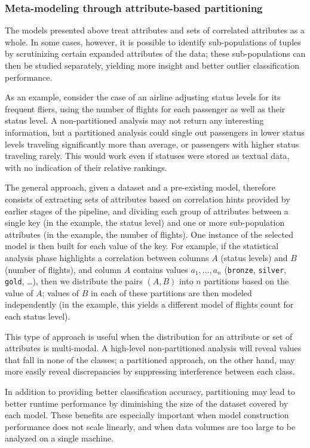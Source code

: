\subsubsection{Meta-modeling through attribute-based partitioning}
\label{sec:partitioning}

The models presented above treat attributes and sets of correlated attributes as a whole. In some cases, however, it is possible to identify sub-populations of tuples by scrutinizing certain expanded attributes of the data; these sub-populations can then be studied separately, yielding more insight and better outlier classification performance.

As an example, consider the case of an airline adjusting status levels for its frequent fliers, using the number of flights for each passenger as well as their status level. A non-partitioned analysis may not return any interesting information, but a partitioned analysis could single out passengers in lower status levels traveling significantly more than average, or passengers with higher status traveling rarely. This would work even if statuses were stored as textual data, with no indication of their relative rankings.

The general approach, given a dataset and a pre-existing model, therefore consists of extracting sets of attributes based on correlation hints provided by earlier stages of the pipeline, and dividing each group of attributes between a single key (in the example, the status level) and one or more sub-population attributes (in the example, the number of flights). One instance of the selected model is then built for each value of the key. For example, if the statistical analysis phase highlights a correlation between columns $A$ (status levels) and $B$ (number of flights), and column $A$ contains values $a_1, \dots, a_n$ (\texttt{bronze}, \texttt{silver}, \texttt{gold}, \dots), then we distribute the pairs $(A, B)$ into $n$ partitions based on the value of $A$; values of $B$ in each of these partitions are then modeled independently (in the example, this yields a different model of flights count for each status level).

This type of approach is useful when the distribution for an attribute or set of attributes is multi-modal. A high-level non-partitioned analysis will reveal values that fall in none of the classes; a partitioned approach, on the other hand, may more easily reveal discrepancies by suppressing interference between each class.

In addition to providing better classification accuracy, partitioning may lead to better runtime performance by diminishing the size of the dataset covered by each model. These benefits are especially important when model construction performance does not scale linearly, and when data volumes are too large to be analyzed on a single machine.

